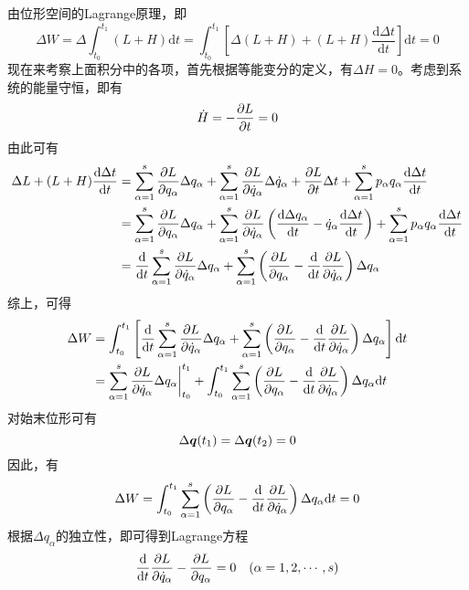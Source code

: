 \begin{example}[由位形空间的Lagrange原理导出Lagrange方程]
由位形空间的Lagrange原理，即
\begin{equation*}
	\Delta W = \Delta \int_{t_0}^{t_1} (L+H) \mathrm{d} t = \int_{t_0}^{t_1} \left[\Delta(L+H) + (L+H) \frac{\mathrm{d} \Delta t}{\mathrm{d} t}\right] \mathrm{d} t = 0
\end{equation*}
现在来考察上面积分中的各项，首先根据等能变分的定义，有$\Delta H = 0$。考虑到系统的能量守恒，即有
\begin{equation*}
	\dot{H} = -\frac{\partial L}{\partial t} = 0
\end{equation*}
由此可有
\begin{align*}
	\Delta L + (L+H) \frac{\mathrm{d} \Delta t}{\mathrm{d} t} & = \sum_{\alpha=1}^s \frac{\partial L}{\partial q_\alpha} \Delta q_\alpha + \sum_{\alpha=1}^s \frac{\partial L}{\partial \dot{q}_\alpha} \Delta \dot{q}_\alpha + \frac{\partial L}{\partial t} \Delta t + \sum_{\alpha=1}^s p_\alpha q_\alpha \frac{\mathrm{d} \Delta t}{\mathrm{d} t}\\
	& = \sum_{\alpha=1}^s \frac{\partial L}{\partial q_\alpha} \Delta q_\alpha + \sum_{\alpha=1}^s \frac{\partial L}{\partial \dot{q}_\alpha} \left(\frac{\mathrm{d} \Delta q_\alpha}{\mathrm{d} t} - \dot{q}_\alpha \frac{\mathrm{d} \Delta t}{\mathrm{d} t}\right) + \sum_{\alpha=1}^s p_\alpha q_\alpha \frac{\mathrm{d} \Delta t}{\mathrm{d} t}\\
	& = \frac{\mathrm{d}}{\mathrm{d} t} \sum_{\alpha=1}^s \frac{\partial L}{\partial \dot{q}_\alpha} \Delta q_\alpha + \sum_{\alpha=1}^s \left(\frac{\partial L}{\partial q_\alpha} - \frac{\mathrm{d}}{\mathrm{d} t} \frac{\partial L}{\partial \dot{q}_\alpha}\right) \Delta q_\alpha
\end{align*}
综上，可得
\begin{align*}
	\Delta W & = \int_{t_0}^{t_1} \left[\frac{\mathrm{d}}{\mathrm{d} t} \sum_{\alpha=1}^s \frac{\partial L}{\partial \dot{q}_\alpha} \Delta q_\alpha + \sum_{\alpha=1}^s \left(\frac{\partial L}{\partial q_\alpha} - \frac{\mathrm{d}}{\mathrm{d} t} \frac{\partial L}{\partial \dot{q}_\alpha}\right) \Delta q_\alpha\right] \mathrm{d} t \\
	& = \sum_{\alpha=1}^s \frac{\partial L}{\partial \dot{q}_\alpha} \Delta q_\alpha\bigg|_{t_0}^{t_1} + \int_{t_0}^{t_1} \sum_{\alpha=1}^s \left(\frac{\partial L}{\partial q_\alpha} - \frac{\mathrm{d}}{\mathrm{d} t} \frac{\partial L}{\partial \dot{q}_\alpha}\right) \Delta q_\alpha \mathrm{d} t
\end{align*}
对始末位形可有
\begin{equation*}
	\Delta \boldsymbol{q}(t_1) = \Delta \boldsymbol{q}(t_2) = 0
\end{equation*}
因此，有
\begin{equation*}
	\Delta W = \int_{t_0}^{t_1} \sum_{\alpha=1}^s \left(\frac{\partial L}{\partial q_\alpha} - \frac{\mathrm{d}}{\mathrm{d} t} \frac{\partial L}{\partial \dot{q}_\alpha}\right) \Delta q_\alpha \mathrm{d} t = 0
\end{equation*}
根据$\Delta q_\alpha$的独立性，即可得到Lagrange方程
\begin{equation*}
	\frac{\mathrm{d}}{\mathrm{d} t} \frac{\partial L}{\partial \dot{q}_\alpha} - \frac{\partial L}{\partial q_\alpha} = 0 \quad (\alpha = 1,2,\cdots,s)
\end{equation*}
\end{example}

